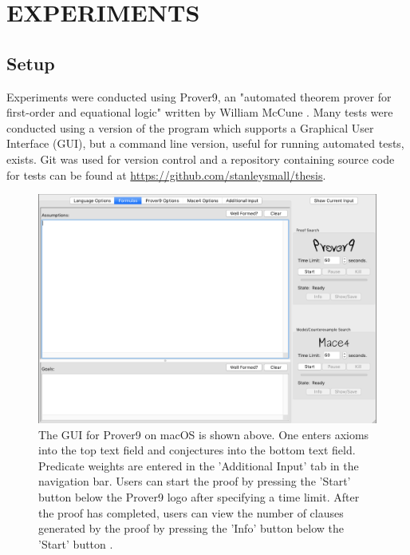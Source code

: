 \documentclass{article}
\begin{document}
\newpage
\vspace*{.05in}
\section{\MakeUppercase{Experiments}}

\subsection{{Setup}}

Experiments were conducted using Prover9, an "automated theorem prover for first-order and equational logic" written by William McCune \cite{mccune2005prover9}. Many tests were conducted using a version of the program which supports a Graphical User Interface (GUI), but a command line version, useful for running automated tests, exists. 
Git was used for version control and a repository containing source code for tests can be found at \url{https://github.com/stanleysmall/thesis}.
\begin{figure}[h]
\centering
\includegraphics[width=6in]{prover9}
\caption{The GUI for Prover9 on macOS is shown above. One enters axioms into the top text field and conjectures into the bottom text field. Predicate weights are entered in the 'Additional Input' tab in the navigation bar. Users can start the proof by pressing the 'Start' button below the Prover9 logo after specifying a time limit. After the proof has completed, users can view the number of clauses generated by the proof by pressing the 'Info' button below the 'Start' button \cite{mccune2005prover9}.}
\label{fig:prover9}
\end{figure}
\end{document}

